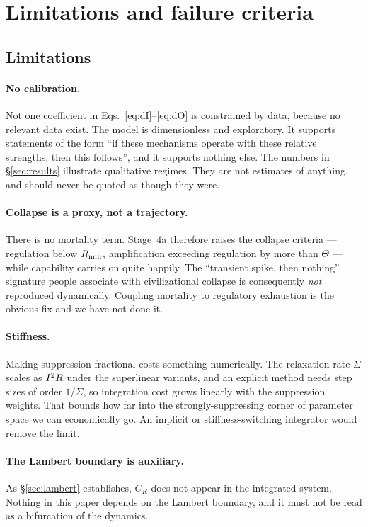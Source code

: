 \section{Limitations and failure criteria}
\label{sec:limitations}

\subsection{Limitations}

\paragraph{No calibration.} Not one coefficient in
Eqs.~\eqref{eq:dI}--\eqref{eq:dO} is constrained by data, because no relevant
data exist. The model is dimensionless and exploratory. It supports statements
of the form ``if these mechanisms operate with these relative strengths, then
this follows'', and it supports nothing else. The numbers in
\S\ref{sec:results} illustrate qualitative regimes. They are not estimates of
anything, and should never be quoted as though they were.

\paragraph{Collapse is a proxy, not a trajectory.} There is no mortality term.
Stage~4a therefore raises the collapse criteria --- regulation below $R_{\mathrm{min}}$,
amplification exceeding regulation by more than $\Theta$ --- while capability
carries on quite happily. The ``transient spike, then nothing'' signature people
associate with civilizational collapse is consequently \emph{not} reproduced
dynamically. Coupling mortality to regulatory exhaustion is the obvious fix and
we have not done it.

\paragraph{Stiffness.} Making suppression fractional costs something numerically.
The relaxation rate $\Sigma$ scales as $I^{2}R$ under the superlinear
variants, and an explicit method needs step sizes of order $1/\Sigma$, so
integration cost grows linearly with the suppression weights. That bounds how
far into the strongly-suppressing corner of parameter space we can economically
go. An implicit or stiffness-switching integrator would remove the limit.

\paragraph{The Lambert boundary is auxiliary.} As \S\ref{sec:lambert} establishes,
$C_R$ does not appear in the integrated system. Nothing in this paper depends on
the Lambert boundary, and it must not be read as a bifurcation of the dynamics.

